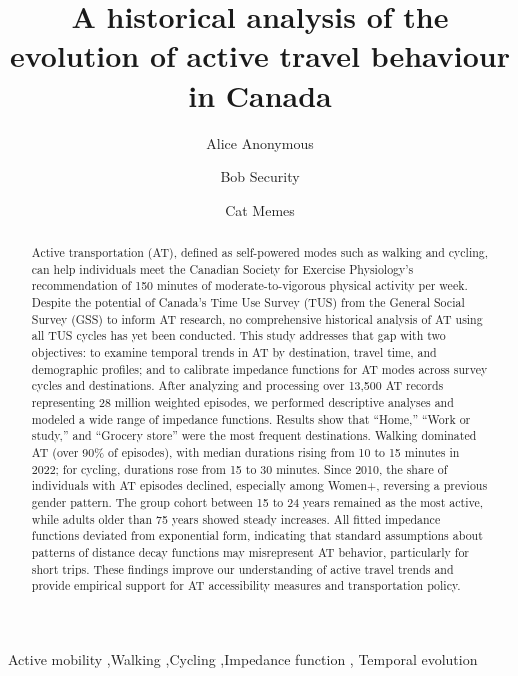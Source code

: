 \documentclass[preprint, 3p,
authoryear]{elsarticle} %
\begin{document}
\begin{frontmatter}

  \title{A historical analysis of the evolution of active travel
behaviour in Canada}
    \author[Some Institute of Technology]{Alice Anonymous%
  }
    \author[Some Institute of Technology]{Bob Security%
  }
    \author[Some Institute of Technology]{Cat Memes%
  }
  
  \begin{abstract}
  Active transportation (AT), defined as self-powered modes such as
  walking and cycling, can help individuals meet the Canadian Society
  for Exercise Physiology's recommendation of 150 minutes of
  moderate-to-vigorous physical activity per week. Despite the potential
  of Canada's Time Use Survey (TUS) from the General Social Survey (GSS)
  to inform AT research, no comprehensive historical analysis of AT
  using all TUS cycles has yet been conducted. This study addresses that
  gap with two objectives: to examine temporal trends in AT by
  destination, travel time, and demographic profiles; and to calibrate
  impedance functions for AT modes across survey cycles and
  destinations. After analyzing and processing over 13,500 AT records
  representing 28 million weighted episodes, we performed descriptive
  analyses and modeled a wide range of impedance functions. Results show
  that ``Home,'' ``Work or study,'' and ``Grocery store'' were the most
  frequent destinations. Walking dominated AT (over 90\% of episodes),
  with median durations rising from 10 to 15 minutes in 2022; for
  cycling, durations rose from 15 to 30 minutes. Since 2010, the share
  of individuals with AT episodes declined, especially among Women+,
  reversing a previous gender pattern. The group cohort between 15 to 24
  years remained as the most active, while adults older than 75 years
  showed steady increases. All fitted impedance functions deviated from
  exponential form, indicating that standard assumptions about patterns
  of distance decay functions may misrepresent AT behavior, particularly
  for short trips. These findings improve our understanding of active
  travel trends and provide empirical support for AT accessibility
  measures and transportation policy.
  \end{abstract}
    \begin{keyword}
    Active mobility \sep Walking \sep Cycling \sep Impedance
function \sep 
    Temporal evolution
  \end{keyword}
  
 \end{frontmatter}
\end{document}
